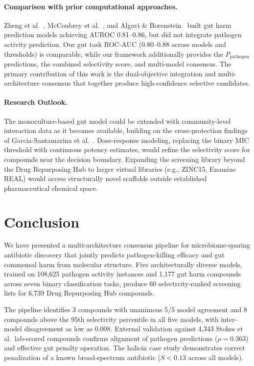 \documentclass{article}
\newcommand{\pp}{P_{\mathrm{pathogen}}}
\begin{document}
\paragraph{Comparison with prior computational approaches.}
Zheng et al.~\citep{zheng2019}, McCoubrey et al.~\citep{mccoubrey2021}, and Algavi \& Borenstein~\citep{algavi2023} built gut harm prediction models achieving AUROC 0.81--0.86, but did not integrate pathogen activity prediction.
Our gut task ROC-AUC (0.80--0.88 across models and thresholds) is comparable, while our framework additionally provides the $\pp$ predictions, the combined selectivity score, and multi-model consensus.
The primary contribution of this work is the dual-objective integration and multi-architecture consensus that together produce high-confidence selective candidates.

\paragraph{Research Outlook.}
The monoculture-based gut model could be extended with community-level interaction data as it becomes available, building on the cross-protection findings of Garcia-Santamarina et al.~\citep{garcia2024}.
Dose-response modeling, replacing the binary MIC threshold with continuous potency estimates, would refine the selectivity score for compounds near the decision boundary.
Expanding the screening library beyond the Drug Repurposing Hub to larger virtual libraries (e.g., ZINC15, Enamine REAL) would access structurally novel scaffolds outside established pharmaceutical chemical space.

\section{Conclusion}
\label{sec:conclusion}

We have presented a multi-architecture consensus pipeline for microbiome-sparing antibiotic discovery that jointly predicts pathogen-killing efficacy and gut commensal harm from molecular structure.
Five architecturally diverse models, trained on 108,625 pathogen activity instances and 1,177 gut harm compounds across seven binary classification tasks, produce 60 selectivity-ranked screening lists for 6,739 Drug Repurposing Hub compounds.

The pipeline identifies 3 compounds with unanimous 5/5 model agreement and 8 compounds above the 95th selectivity percentile in all five models, with inter-model disagreement as low as 0.008.
External validation against 4,343 Stokes et al.\ lab-scored compounds confirms alignment of pathogen predictions ($\rho = 0.363$) and effective gut penalty operation.
The halicin case study demonstrates correct penalization of a known broad-spectrum antibiotic ($S < 0.13$ across all models).
\end{document}

